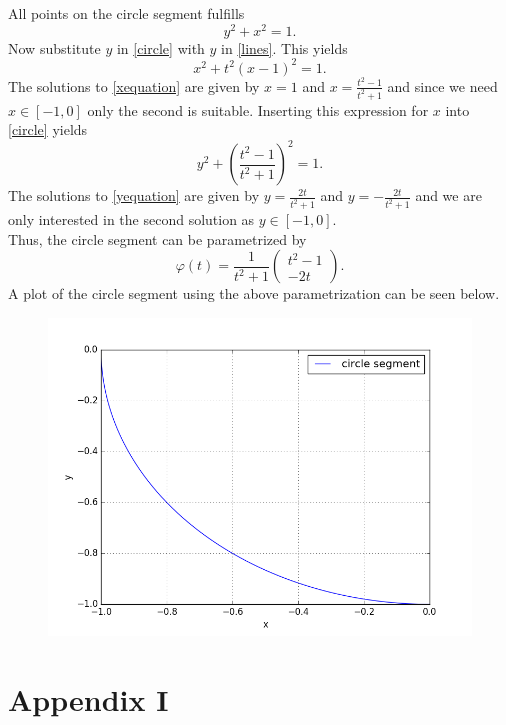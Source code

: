 \documentclass[]{article}
\begin{document}
All points on the circle segment fulfills \begin{equation}\label{circle}
y^2 + x^2 = 1.
\end{equation} 
Now substitute $y$ in \eqref{circle} with $y$ in \eqref{lines}. This yields\begin{equation}\label{xequation}
x^2 + t^2(x - 1)^2 = 1.
\end{equation}
The solutions to \eqref{xequation} are given by $x=1$ and $x=\frac{t^2 - 1}{t^2 + 1}$ and since we need $x\in [-1, 0]$ only the second is suitable. Inserting this expression for $x$ into \eqref{circle} yields\begin{equation}\label{yequation}
y^2 + \left(\frac{t^2 - 1}{t^2 + 1}\right)^2 = 1.
\end{equation}
The solutions to \eqref{yequation} are given by $y=\frac{2t}{t^2 + 1}$ and $y=-\frac{2t}{t^2 + 1}$ and we are only interested in the second solution as $y\in[-1, 0]$.\\
Thus, the circle segment can be parametrized by \begin{equation*}
\varphi(t)=\frac{1}{t^2 + 1}\left(\begin{array}{c}
t^2 - 1\\
-2t
\end{array}\right).
\end{equation*}
A plot of the circle segment using the above parametrization can be seen below.

\begin{figure}[h!]
	\includegraphics[scale=0.6]{circlesegment}
\end{figure}

\newpage
\section*{Appendix I}

\end{document}
